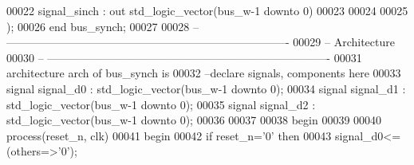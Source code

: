 \begin{DoxyCode}
00022           \textcolor{keywordflow}{signal}\textcolor{vhdlchar}{\_sinch}      \textcolor{vhdlchar}{:} \textcolor{keywordflow}{out} \textcolor{comment}{std\_logic\_vector}\textcolor{vhdlchar}{(}\textcolor{vhdlchar}{bus_w}\textcolor{vhdlchar}{-}\textcolor{vhdllogic}{}\textcolor{vhdllogic}{1} \textcolor{keywordflow}{downto} \textcolor{vhdllogic}{}\textcolor{vhdllogic}{0}\textcolor{vhdlchar}{)}
00023 
00024         
00025         \textcolor{vhdlchar}{)};
00026 \textcolor{keywordflow}{end} \textcolor{vhdlchar}{bus\_synch};
00027 
00028 \textcolor{keyword}{-- ----------------------------------------------------------------------------}
00029 \textcolor{keyword}{-- Architecture}
00030 \textcolor{keyword}{-- ----------------------------------------------------------------------------}
00031 \textcolor{keywordflow}{architecture} arch \textcolor{keywordflow}{of} bus_synch is
00032 \textcolor{keyword}{--declare signals,  components here}
00033 \textcolor{keywordflow}{signal} \textcolor{vhdlchar}{signal_d0} \textcolor{vhdlchar}{:} \textcolor{comment}{std\_logic\_vector}\textcolor{vhdlchar}{(}\textcolor{vhdlchar}{bus_w}\textcolor{vhdlchar}{-}\textcolor{vhdllogic}{}\textcolor{vhdllogic}{1} \textcolor{keywordflow}{downto} \textcolor{vhdllogic}{}\textcolor{vhdllogic}{0}\textcolor{vhdlchar}{)}; 
00034 \textcolor{keywordflow}{signal} \textcolor{vhdlchar}{signal_d1} \textcolor{vhdlchar}{:} \textcolor{comment}{std\_logic\_vector}\textcolor{vhdlchar}{(}\textcolor{vhdlchar}{bus_w}\textcolor{vhdlchar}{-}\textcolor{vhdllogic}{}\textcolor{vhdllogic}{1} \textcolor{keywordflow}{downto} \textcolor{vhdllogic}{}\textcolor{vhdllogic}{0}\textcolor{vhdlchar}{)}; 
00035 \textcolor{keywordflow}{signal} \textcolor{vhdlchar}{signal_d2} \textcolor{vhdlchar}{:} \textcolor{comment}{std\_logic\_vector}\textcolor{vhdlchar}{(}\textcolor{vhdlchar}{bus_w}\textcolor{vhdlchar}{-}\textcolor{vhdllogic}{}\textcolor{vhdllogic}{1} \textcolor{keywordflow}{downto} \textcolor{vhdllogic}{}\textcolor{vhdllogic}{0}\textcolor{vhdlchar}{)};
00036 
00037   
00038 \textcolor{vhdlkeyword}{begin}
00039 
00040   \textcolor{keywordflow}{process}(reset_n, clk)
00041 \textcolor{vhdlkeyword}{    begin}
00042       \textcolor{keywordflow}{if} \textcolor{vhdlchar}{reset_n}\textcolor{vhdlchar}{=}\textcolor{vhdlchar}{'}\textcolor{vhdllogic}{}\textcolor{vhdllogic}{0}\textcolor{vhdlchar}{'} \textcolor{keywordflow}{then}
00043         \textcolor{keywordflow}{signal}\textcolor{vhdlchar}{\_d0}\textcolor{vhdlchar}{<=}\textcolor{vhdlchar}{(}\textcolor{keywordflow}{others}\textcolor{vhdlchar}{=}\textcolor{vhdlchar}{>}\textcolor{vhdlchar}{'}\textcolor{vhdllogic}{}\textcolor{vhdllogic}{0}\textcolor{vhdlchar}{'}\textcolor{vhdlchar}{)};

\end{DoxyCode}
